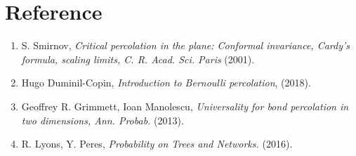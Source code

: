 \documentclass[12pt]{article}
\theoremstyle{plane}
\theoremstyle{definition}
\begin{document}
\section*{Reference}

\begin{enumerate}
\item S. Smirnov, \textit{Critical percolation in the plane: Conformal invariance, Cardy's formula, scaling limits, C. R. Acad. Sci. Paris} (2001).
\item Hugo Duminil-Copin, \textit{Introduction to Bernoulli percolation}, (2018).
\item Geoffrey R. Grimmett, Ioan Manolescu, \textit{Universality for bond percolation in two dimensions, Ann. Probab.} (2013).
\item R. Lyons, Y. Peres, \textit{Probability on Trees and Networks.} (2016).
\end{enumerate}
\end{document}

